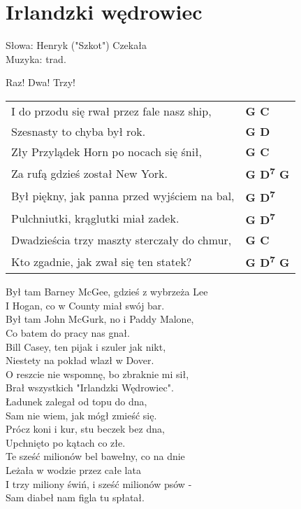 \section{Irlandzki wędrowiec}

Słowa: Henryk ("Szkot") Czekała \\
Muzyka:  trad.

\vspace{2em}
Raz! Dwa! Trzy! \\
\begin{tabular}{@{}p{9cm}@{}l@{}}
I do przodu się rwał przez fale nasz ship, & \bfseries   G C \\
Szesnasty to chyba był rok. & \bfseries   G D \\
Zły Przylądek Horn po nocach się śnił, & \bfseries   G C \\
Za rufą gdzieś został New York. & \bfseries   G D\textsuperscript{7} G \\
Był piękny, jak panna przed wyjściem na bal, & \bfseries   G D\textsuperscript{7} \\
Pulchniutki, krąglutki miał zadek. & \bfseries   G D\textsuperscript{7} \\
Dwadzieścia trzy maszty sterczały do chmur, & \bfseries   G C \\
Kto zgadnie, jak zwał się ten statek? & \bfseries   G D\textsuperscript{7} G \\
\end{tabular}

\vspace{1em}
Był tam Barney McGee, gdzieś z wybrzeża Lee \\
I Hogan, co w County miał swój bar. \\
Był tam John McGurk, no i Paddy Malone, \\
Co batem do pracy nas gnał. \\
Bill Casey, ten pijak i szuler jak nikt, \\
Niestety na pokład wlazł w Dover. \\
O reszcie nie wspomnę, bo zbraknie mi sił, \\
Brał wszystkich "Irlandzki Wędrowiec". \\

Ładunek zalegał od topu do dna, \\
Sam nie wiem, jak mógł zmieść się. \\
Prócz koni i kur, stu beczek bez dna, \\
Upchnięto po kątach co złe. \\
Te sześć milionów bel bawełny, co na dnie \\
Leżała w wodzie przez całe lata \\
I trzy miliony świń, i sześć milionów psów - \\
Sam diabeł nam figla tu spłatał. \\

